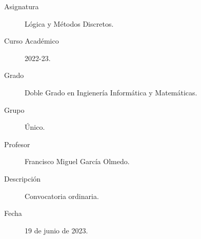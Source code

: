 \documentclass[12pt]{article}
\begin{document}

    
    

    \begin{description}
        \item[Asignatura] Lógica y Métodos Discretos.
        \item[Curso Académico] 2022-23.
        \item[Grado] Doble Grado en Ingienería Informática y Matemáticas.
        \item[Grupo] Único.
        \item[Profesor] Francisco Miguel García Olmedo.
        \item[Descripción] Convocatoria ordinaria.
        \item[Fecha] 19 de junio de 2023.
    
    \end{description}
    \newpage
\end{document}
